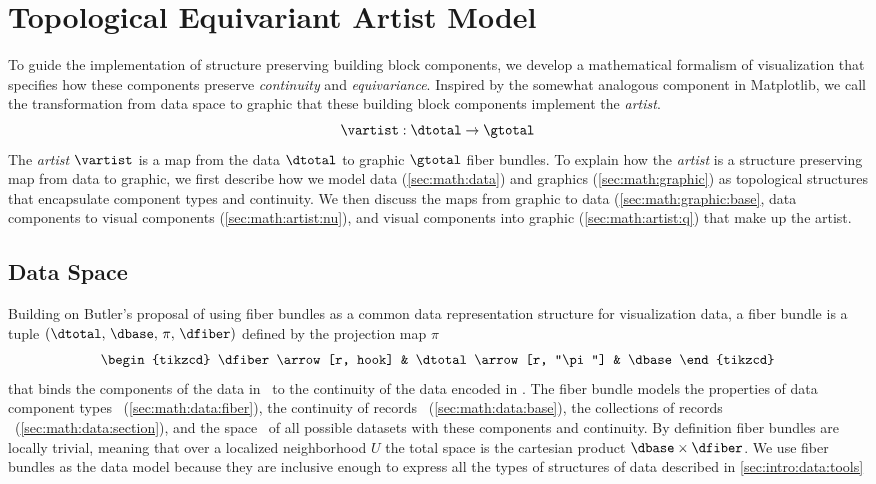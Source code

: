 \documentclass[../main.tex]{subfiles}
\begin{document}
\section{Topological Equivariant Artist Model}
\label{sec:math}
To guide the implementation of structure preserving building block components, we develop a mathematical formalism of visualization that specifies how these components preserve \textit{continuity} and \textit{equivariance}. Inspired by the somewhat analogous component in Matplotlib\cite{hunterArchitectureOpenSource}, we call the transformation from data space to graphic that these building block components implement the \textit{artist}.
\begin{equation}
    \label{eq:artist}
    \mathscr{\vartist}: \mathscr{\dtotal} \rightarrow \mathscr{\gtotal}
\end{equation}
The \textit{artist} $\mathscr{\vartist}$ is a map from the data $\mathscr{\dtotal}$ to graphic $\mathscr{\gtotal}$ fiber bundles. To explain how the \textit{artist} is a structure preserving map from data to graphic, we first describe how we model data (\autoref{sec:math:data}) and graphics (\autoref{sec:math:graphic}) as topological structures that encapsulate component types and continuity. We then discuss the maps from graphic to data (\autoref{sec:math:graphic:base}, data components to visual components (\autoref{sec:math:artist:nu}), and visual components into graphic (\autoref{sec:math:artist:q}) that make up the artist.

\subsection{Data Space \dtotal}
\label{sec:math:data}
Building on Butler's proposal of using fiber bundles as a common data representation structure for visualization data\cite{butlerVectorBundleClassesForm1992, butlerVisualizationModelBased1989}, a fiber bundle is a tuple $(\dtotal,\,\dbase,\,\pi ,\,\dfiber)$ defined by the projection map $\pi$
\begin{equation}
    \label{eq:fiber_bundle}
    \begin{tikzcd}
        \dfiber \arrow[r, hook] & \dtotal \arrow[r, "\pi"] & \dbase
    \end{tikzcd}
\end{equation}
that binds the components of the data in \dfiber\ to the continuity of the data encoded in \dbase. The fiber bundle models the properties of data component types \dfiber\ (\autoref{sec:math:data:fiber}), the continuity of records \dbase\ (\autoref{sec:math:data:base}), the collections of records \dsection\ (\autoref{sec:math:data:section}), and the space \dtotal\ of all possible datasets with these components and continuity. By definition fiber bundles are locally trivial\cite{spanier1989algebraic,LocallyTrivialFibre}, meaning that over a localized neighborhood $U$ the total space is the cartesian product $\dbase\times\dfiber$. We use fiber bundles as the data model because they are inclusive enough to express all the types of structures of data described in \autoref{sec:intro:data:tools}
\end{document}
